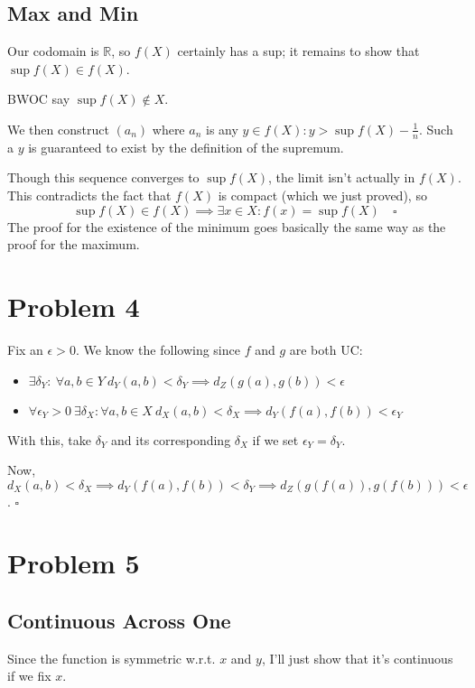 \documentclass[12pt]{article}
\newcommand{\R}{\mathbb{R}}
\begin{document}
\subsection{Max and Min}

Our codomain is $\R$, so $f(X)$ certainly has a sup; it remains to show that $\sup f(X) \in f(X)$.

BWOC say $\sup f(X) \notin X$.

We then construct $(a_n)$ where $a_n$ is any $y \in f(X): y > \sup f(X) - \frac{1}{n}$.
Such a $y$ is guaranteed to exist by the definition of the supremum.

Though this sequence converges to $\sup f(X)$, the limit isn't actually in $f(X)$.
This contradicts the fact that $f(X)$ is compact (which we just proved), so
\[\sup f(X) \in f(X) \implies \exists x \in X: f(x) = \sup f(X)\quad\square\]
The proof for the existence of the minimum goes basically the same way as the proof for the maximum.

\pagebreak

\section{Problem 4}

Fix an $\epsilon > 0$. We know the following since $f$ and $g$ are both UC:
\begin{itemize}
  \item $\exists \delta_Y:\ \forall a, b \in Y\ d_Y(a, b) < \delta_Y \implies d_Z(g(a), g(b)) < \epsilon$
  \item $\forall \epsilon_Y > 0\ \exists \delta_X: \forall a, b \in X\ d_X(a, b) < \delta_X \implies d_Y(f(a), f(b)) < \epsilon_Y$
\end{itemize}
With this, take $\delta_Y$ and its corresponding $\delta_X$ if we set $\epsilon_Y=\delta_Y$.

Now, $d_X(a, b) < \delta_X \implies d_Y(f(a), f(b)) < \delta_Y \implies d_Z(g(f(a)), g(f(b))) < \epsilon$. $\square$

\section{Problem 5}

\subsection{Continuous Across One}

Since the function is symmetric w.r.t. $x$ and $y$, I'll just show
that it's continuous if we fix $x$.
\end{document}
